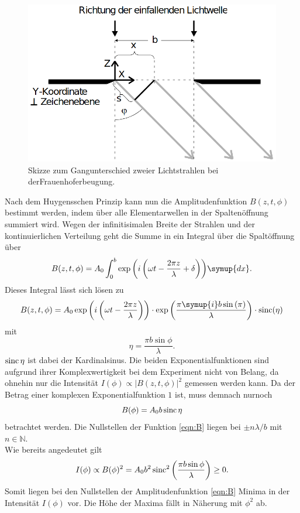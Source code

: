 \begin{figure}[H]
    \centering
    \includegraphics[scale = 0.45]{pictures/frauenhofer2.png}
    \caption{Skizze zum Gangunterschied zweier Lichtstrahlen bei derFrauenhoferbeugung. \cite{AP01}}
    \label{fig:frauenhofer2}
\end{figure}

\noindent
Nach dem Huygensschen Prinzip kann nun die Amplitudenfunktion $B(z,t,\phi)$ bestimmt werden, indem über alle Elementarwellen
in der Spaltenöffnung summiert wird. Wegen der infinitisimalen Breite der Strahlen und der kontinuierlichen Verteilung geht die Summe in ein
Integral über die Spaltöffnung über
\begin{equation*}
    B(z,t,\phi)=A_0\int_0^b{\exp{\left(i\left(\omega t-\frac{2\pi z}{\lambda}+\delta\right)\right)}\symup{dx}}    .
\end{equation*}
Dieses Integral lässt sich lösen zu
\begin{equation*}
    B(z,t,\phi) = A_0\exp{\left(i\left(\omega t-\frac{2 \pi z}{\lambda}\right)\right)}
                \cdot\exp{\left(\frac{\pi \symup{i} b \sin{(\pi)}}{\lambda}\right)}
                \cdot \sinc(\eta)
\end{equation*}
mit
\begin{equation*}
    \eta=\frac{\pi b \sin{\phi}}{\lambda}   .
\end{equation*}
$\operatorname{sinc}{\eta}$ ist dabei der Kardinalsinus. Die beiden Exponentialfunktionen sind aufgrund ihrer Komplexwertigkeit bei dem Experiment nicht von Belang,
da ohnehin nur die Intensität $I(\phi)\propto |B(z,t,\phi)|^2$ gemessen werden kann. Da der Betrag einer komplexen Exponentialfunktion $\num{1}$ ist, muss
demnach nurnoch
\begin{equation}
    B(\phi)=A_0b\operatorname{sinc}{\eta}
    \label{eqn:B}
\end{equation}
betrachtet werden. Die Nullstellen der Funktion \eqref{eqn:B} liegen bei $\pm n\lambda/b$ mit $n \in \mathbb{N}$.
\\\noindent
Wie bereits angedeutet gilt
\begin{equation}
    I(\phi)\propto B(\phi)^2=
    A_0b^2\operatorname{sinc}^2{\left(\frac{\pi b \sin{\phi}}{\lambda}\right)}
    \geq 0  .
    \label{eqn:intensität1}
\end{equation}
Somit liegen bei den Nullstellen der Amplitudenfunktion \ref{eqn:B} Minima in der Intensität $I(\phi)$ vor. Die Höhe der Maxima fällt in
Näherung mit $\phi^2$ ab.

